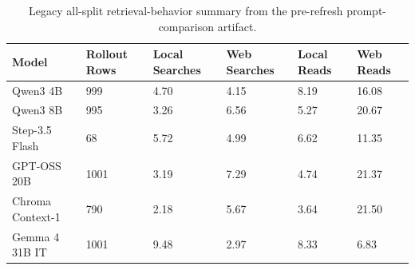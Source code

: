 \begin{table}[t]
\small
\centering
\begin{tabular}{llllll}
\toprule
\textbf{Model} & \textbf{Rollout Rows} & \textbf{Local Searches} & \textbf{Web Searches} & \textbf{Local Reads} & \textbf{Web Reads} \\
\midrule
Qwen3 4B & 999 & 4.70 & 4.15 & 8.19 & 16.08 \\
Qwen3 8B & 995 & 3.26 & 6.56 & 5.27 & 20.67 \\
Step-3.5 Flash & 68 & 5.72 & 4.99 & 6.62 & 11.35 \\
GPT-OSS 20B & 1001 & 3.19 & 7.29 & 4.74 & 21.37 \\
Chroma Context-1 & 790 & 2.18 & 5.67 & 3.64 & 21.50 \\
Gemma 4 31B IT & 1001 & 9.48 & 2.97 & 8.33 & 6.83 \\
\bottomrule
\end{tabular}
\caption{Legacy all-split retrieval-behavior summary from the pre-refresh prompt-comparison artifact.}
\label{tab:legacy_retrieval_behavior_all}
\end{table}
